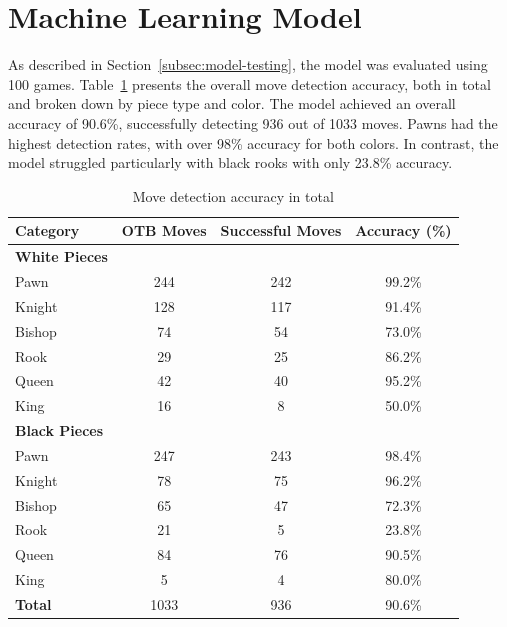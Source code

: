 \section{Machine Learning Model}

As described in Section~\ref{subsec:model-testing}, the model was evaluated using 100 games. Table~\ref{tab:accuracy-total} presents the overall move detection accuracy, both in total and broken down by piece type and color. The model achieved an overall accuracy of 90.6\%, successfully detecting 936 out of 1033 moves. Pawns had the highest detection rates, with over 98\% accuracy for both colors. In contrast, the model struggled particularly with black rooks with only 23.8\% accuracy.


\begin{table}[htbp]
\centering
\caption{Move detection accuracy in total}
\label{tab:accuracy-total}
\begin{tabular}{lccc}
\toprule
\textbf{Category} & \textbf{OTB Moves} & \textbf{Successful Moves} & \textbf{Accuracy (\%)} \\
\midrule
\textbf{White Pieces} & & & \\
\hspace{1em}Pawn  & 244 & 242 & 99.2\% \\
\hspace{1em}Knight & 128 & 117 & 91.4\% \\
\hspace{1em}Bishop & 74  & 54  & 73.0\% \\
\hspace{1em}Rook   & 29  & 25  & 86.2\% \\
\hspace{1em}Queen  & 42  & 40  & 95.2\% \\
\hspace{1em}King   & 16  & 8   & 50.0\% \\
\midrule
\textbf{Black Pieces} & & & \\
\hspace{1em}Pawn  & 247 & 243 & 98.4\% \\
\hspace{1em}Knight & 78  & 75  & 96.2\% \\
\hspace{1em}Bishop & 65  & 47  & 72.3\% \\
\hspace{1em}Rook   & 21  & 5   & 23.8\% \\
\hspace{1em}Queen  & 84  & 76  & 90.5\% \\
\hspace{1em}King   & 5   & 4   & 80.0\% \\
\midrule
\textbf{Total} & 1033 & 936 & 90.6\% \\
\bottomrule
\end{tabular}
\end{table}


